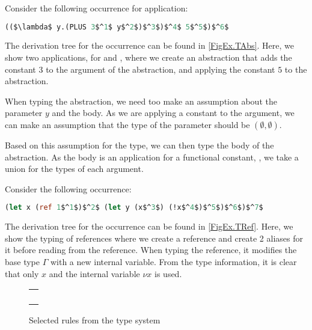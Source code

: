 \documentclass[acmsmall,sigplan]{acmart}
\begin{document}
\begin{example}
	Consider the following occurrence for application:
	\begin{lstlisting}[language=Caml, mathescape=true]
		(($\lambda$ y.(PLUS 3$^1$ y$^2$)$^3$)$^4$ 5$^5$)$^6$
	\end{lstlisting}
	The derivation tree for the occurrence can be found in \cref{FigEx.TAbs}.
	Here, we show two applications, for  and , where we create an abstraction that adds the constant $3$ to the argument of the abstraction, and applying the constant $5$ to the abstraction.

	When typing the abstraction, we need too make an assumption about the parameter $y$ and the body.
	As we are applying a constant to the argument, we can make an assumption that the type of the parameter should be $(\emptyset,\emptyset)$.

	Based on this assumption for the type, we can then type the body of the abstraction.
	As the body is an application for a functional constant, , we take a union for the types of each argument.
\end{example}

\begin{example}
	Consider the following occurrence:
	\begin{lstlisting}[language=Caml, mathescape=true]
		(let x (ref 1$^1$)$^2$ (let y (x$^3$) (!x$^4$)$^5$)$^6$)$^7$
	\end{lstlisting}
	The derivation tree for the occurrence can be found in \cref{FigEx.TRef}.
	Here, we show the typing of references where we create a reference and create 2 aliases for it before reading from the reference.
	When typing the reference, it modifies the base type $\Gamma$ with a new internal variable.
	From the type information, it is clear that only $x$ and the internal variable $\nu x$ is used.
\end{example}

\begin{figure}[H]
	\setlength\tabcolsep{8pt}
	\begin{tabular}{l}
		\\[0.7cm]
		\\[0.7cm]
		\\[0.7cm]
		\\[0.7cm]
		\\[0.7cm]
	\end{tabular}
	\caption{Selected rules from the type system}
	\label{fig:TypeSys}
\end{figure}

% 
\end{document}
